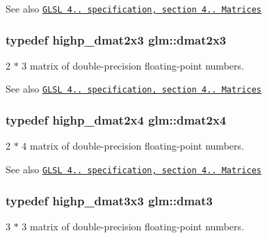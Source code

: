 \begin{DoxySeeAlso}{See also}
\href{http://www.opengl.org/registry/doc/GLSLangSpec.4.20.8.pdf}{\tt G\+L\+SL 4.. specification, section 4.. Matrices} 
\end{DoxySeeAlso}
\subsubsection[{\texorpdfstring{dmat2x3}{dmat2x3}}]{\setlength{\rightskip}{0pt plus 5cm}typedef highp\+\_\+dmat2x3 {\bf glm\+::dmat2x3}}\hypertarget{group__core__types_ga6b5ff9888ca0e468f35b637d4c3a361d}{}\label{group__core__types_ga6b5ff9888ca0e468f35b637d4c3a361d}
2 $\ast$ 3 matrix of double-\/precision floating-\/point numbers.

\begin{DoxySeeAlso}{See also}
\href{http://www.opengl.org/registry/doc/GLSLangSpec.4.20.8.pdf}{\tt G\+L\+SL 4.. specification, section 4.. Matrices} 
\end{DoxySeeAlso}
\subsubsection[{\texorpdfstring{dmat2x4}{dmat2x4}}]{\setlength{\rightskip}{0pt plus 5cm}typedef highp\+\_\+dmat2x4 {\bf glm\+::dmat2x4}}\hypertarget{group__core__types_ga2d1dd4b4925d1ea67539902c820483a0}{}\label{group__core__types_ga2d1dd4b4925d1ea67539902c820483a0}
2 $\ast$ 4 matrix of double-\/precision floating-\/point numbers.

\begin{DoxySeeAlso}{See also}
\href{http://www.opengl.org/registry/doc/GLSLangSpec.4.20.8.pdf}{\tt G\+L\+SL 4.. specification, section 4.. Matrices} 
\end{DoxySeeAlso}
\subsubsection[{\texorpdfstring{dmat3}{dmat3}}]{\setlength{\rightskip}{0pt plus 5cm}typedef highp\+\_\+dmat3x3 {\bf glm\+::dmat3}}\hypertarget{group__core__types_ga25fd62195c3ef5ac0d32ead1dbfbb929}{}\label{group__core__types_ga25fd62195c3ef5ac0d32ead1dbfbb929}
3 $\ast$ 3 matrix of double-\/precision floating-\/point numbers.

